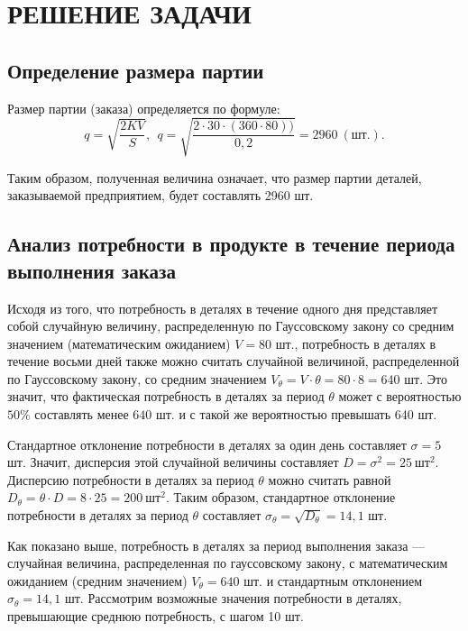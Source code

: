 \section{РЕШЕНИЕ ЗАДАЧИ}

\subsection{Определение размера партии}

Размер партии (заказа) определяется по формуле:
\begin{equation*}
	q = \sqrt{\dfrac{2KV}{S}}, ~~ q = \sqrt{\dfrac{2 \cdot 30 \cdot (360 \cdot 80))}{0,2}} = 2960 \: (\text{шт.}).
\end{equation*}

Таким образом, полученная величина означает, что размер партии деталей,
заказываемой предприятием, будет составлять 2960 шт.


\subsection{Анализ потребности в продукте в течение периода \\ выполнения заказа}

Исходя из того, что потребность в деталях в течение одного дня представляет
собой случайную величину, распределенную по Гауссовскому закону со средним значением
(математическим ожиданием) $V=80$ шт., потребность в деталях в течение восьми дней
также можно считать случайной величиной, распределенной по Гауссовскому закону,
со средним значением $V_\theta = V \cdot \theta = 80 \cdot 8 = 640 $ шт.
Это значит, что фактическая потребность в деталях за период $\theta$ может
с вероятностью $50\%$ составлять менее $640$ шт. и с такой же вероятностью превышать $640$ шт.

Стандартное отклонение потребности в деталях за один день составляет $\sigma=5$ шт.
Значит, дисперсия этой случайной величины составляет $D = \sigma^2 = 25 \: \text{шт}^2 $.
Дисперсию потребности в деталях за период $\theta$ можно считать равной
$D_\theta = \theta \cdot D = 8 \cdot 25 = 200 \: \text{шт}^2$. Таким образом,
стандартное отклонение потребности в деталях за период $\theta$ составляет
$\sigma_{\theta} = \sqrt{D_\theta} = 14{,}1 $ шт.

Как показано выше, потребность в деталях за период выполнения заказа ---
случайная величина, распределенная по гауссовскому закону, с математическим
ожиданием (средним значением)  $V_\theta = 640 $ шт. и стандартным отклонением $\sigma_{\theta} = 14{,}1 $ шт.
Рассмотрим возможные значения потребности в деталях, превышающие среднюю потребность, с шагом 10 шт.

